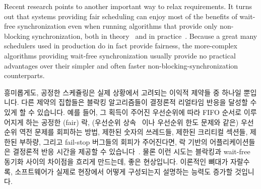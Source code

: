 Recent research points to another important way to relax requirements.
It turns out that systems providing fair scheduling can enjoy most
of the benefits of wait-free synchronization even when running
algorithms that provide only non-blocking
synchronization, both in theory~\cite{DanAlitarh2013PracticalProgress}
and in practice~\cite{SamyAlBahra2013NBS}.
Because a great many schedulers used in production do in fact
provide fairness,
the more-complex algorithms providing wait-free synchronization
usually provide no practical advantages over their simpler
and often faster non-blocking-synchronization counterparts.
\fi

흥미롭게도, 공정한 스케쥴링은 실제 상황에서 고려되는 이익적 제약들 중 하나일
뿐입니다.
다른 제약의 집합들은 블락킹 알고리즘들이 결정론적 리얼타임 반응을 달성할 수
있게 할 수 있습니다.
예를 들어, 그 획득이 주어진 우선순위에 따라 FIFO 순서로 이루어지게 하는 공정한
(fair) 락, (우선순위
상속~\cite{Takada:1995:RSN:527074.828566,Cai-DongWang1996PrioInherLock} 이나
우선순위 한도 문제와 같은) 우선순위 역전 문제를 회피하는 방법, 제한된 숫자의
쓰레드들, 제한된 크리티컬 섹션들, 제한된 부하량, 그리고 fail-stop 버그들의
회피가 주어진다면, 락 기반의 어플리케이션들은 결정론적 반응 시간을 제공할 수
있습니다~\cite{BjoernBrandenburgPhD}.
물론 이런 시도는 블락킹과 wait-free 동기화 사이의 차이점을 흐리게 만드는데,
좋은 현상입니다.
이론적인 뼈대가 자랄수록, 소프트웨어가 실제로 현장에서 어떻게 구성되는지
설명하는 능력도 증가할 것입니다.
\iffalse

Interestingly enough, fair scheduling is but one beneficial
constraint that is often respected in practice.
Other sets of constraints can permit blocking algorithms to
achieve deterministic real-time response.
For example, given fair locks that are granted to requesters in FIFO order at
a given priority level,
a method of avoiding priority inversion (such as priority
inheritance~\cite{Takada:1995:RSN:527074.828566,Cai-DongWang1996PrioInherLock}
or priority ceiling), a bounded number of threads,
bounded critical sections,
bounded load,
and avoidance of fail-stop bugs,
lock-based applications can provide deterministic
response times~\cite{BjoernBrandenburgPhD}.
This approach of course blurs the distinction between blocking and wait-free
synchronization, which is all to the good.
Hopefully theoeretical frameworks continue to grow, further increasing
their ability to
describe how software is actually constructed in practice.
\fi
